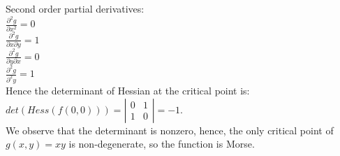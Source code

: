 \documentclass[]{article}
\begin{document}
Second order partial derivatives: \\
$\frac{\partial^2 g}{\partial x^2}=0$\\
$\frac{\partial^2 g}{\partial x \partial y}=1$\\
$\frac{\partial^2 g}{\partial y \partial x}=0$\\
$\frac{\partial^2 g}{\partial^2 y}=1$\\
Hence the determinant of Hessian at the critical point is: \\
$det(Hess(f(0,0)))=\left| \begin{array}{cc} 0 & 1 \\ 1 & 0 \end{array} \right|=-1$. \\
We observe that the determinant is nonzero, hence, the only critical point of $g(x,y)=xy$ is non-degenerate, so the function is Morse. \\
\\
\\
\end{document}
